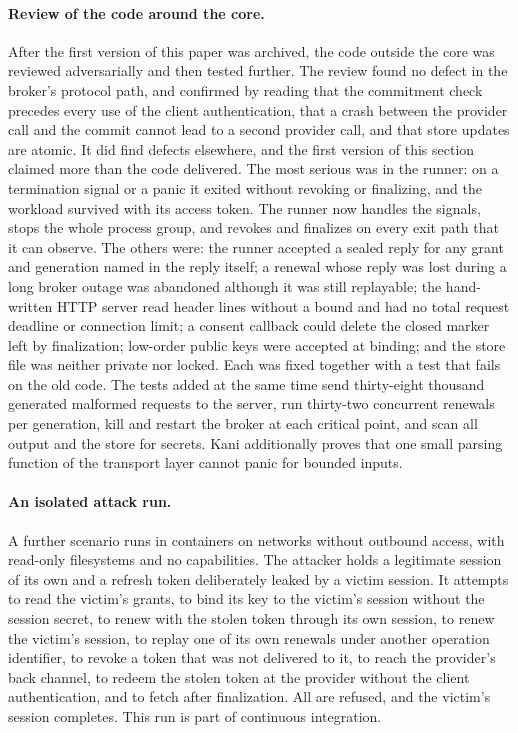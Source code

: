 \documentclass[11pt]{article}
\begin{document}
\paragraph{Review of the code around the core.} After the first version of this paper was archived, the code outside the core was reviewed adversarially and then tested further. The review found no defect in the broker's protocol path, and confirmed by reading that the commitment check precedes every use of the client authentication, that a crash between the provider call and the commit cannot lead to a second provider call, and that store updates are atomic. It did find defects elsewhere, and the first version of this section claimed more than the code delivered. The most serious was in the runner: on a termination signal or a panic it exited without revoking or finalizing, and the workload survived with its access token. The runner now handles the signals, stops the whole process group, and revokes and finalizes on every exit path that it can observe. The others were: the runner accepted a sealed reply for any grant and generation named in the reply itself; a renewal whose reply was lost during a long broker outage was abandoned although it was still replayable; the hand-written HTTP server read header lines without a bound and had no total request deadline or connection limit; a consent callback could delete the closed marker left by finalization; low-order public keys were accepted at binding; and the store file was neither private nor locked. Each was fixed together with a test that fails on the old code. The tests added at the same time send thirty-eight thousand generated malformed requests to the server, run thirty-two concurrent renewals per generation, kill and restart the broker at each critical point, and scan all output and the store for secrets. Kani additionally proves that one small parsing function of the transport layer cannot panic for bounded inputs.

\paragraph{An isolated attack run.} A further scenario runs in containers on networks without outbound access, with read-only filesystems and no capabilities. The attacker holds a legitimate session of its own and a refresh token deliberately leaked by a victim session. It attempts to read the victim's grants, to bind its key to the victim's session without the session secret, to renew with the stolen token through its own session, to renew the victim's session, to replay one of its own renewals under another operation identifier, to revoke a token that was not delivered to it, to reach the provider's back channel, to redeem the stolen token at the provider without the client authentication, and to fetch after finalization. All are refused, and the victim's session completes. This run is part of continuous integration.
\end{document}
